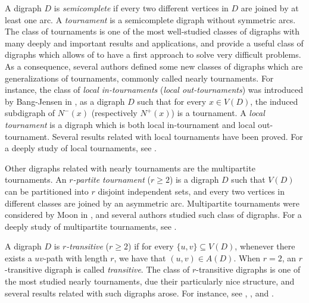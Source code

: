 \documentclass[10pt,a4paper]{article}
\begin{document}
A digraph $D$ is \emph{semicomplete} if every two different vertices in $D$ are joined by at least one arc. 
A \emph{tournament} is a semicomplete digraph without symmetric arcs.
 The class of tournaments is one of the most well-studied classes of digraphs with many deeply and important results and applications, and provide a useful class of digraphs which allows of to have a first approach to solve very difficult problems.
As a consequence, several authors defined some new classes of digraphs which are generalizations of tournaments, commonly called nearly tournaments.
For instance, the class of \emph{local in-tournaments} (\emph{local out-tournaments}) was introduced by Bang-Jensen in \cite{localtour}, as a digraph $D$ such that for every $x \in V(D)$, the induced subdigraph of $N^{-}(x)$ (respectively $N^{+}(x)$) is a tournament. A \emph{local tournament} is a digraph which is both local in-tournament and local out-tournament. Several results related with local tournaments have been proved. For a deeply study of local tournaments, see \cite{bangjen}.  

Other digraphs related with nearly tournaments are the multipartite tournaments. An \emph{$r$-partite tournament} ($r \geq 2$) is a digraph $D$ such that $V(D)$ can be partitioned into $r$ disjoint independent sets, and every two vertices in different classes are joined by an asymmetric arc. Multipartite tournaments were considered by Moon in \cite{moon}, and several authors studied such class of digraphs.  For a deeply study of multipartite tournaments, see \cite{bangjen}. 

A digraph $D$ is \textit{$r$-transitive} ($r \geq 2$) if for every $\{u,v\} \subseteq V(D)$, whenever there exists a $uv$-path with length $r$, we have that $(u,v) \in A(D)$. When $r=2$, an $r$-transitive digraph is called \textit{transitive}. The class of $r$-transitive digraphs is one of the most studied nearly tournaments, due their particularly nice structure, and several results related with such digraphs arose. For instance, see \cite{bangjen}, \cite{ktrans3}, \cite{ktrans1} and \cite{ktrans2}.
\end{document}
